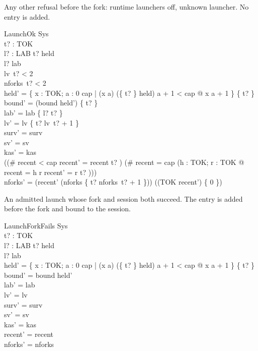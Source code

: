 \documentclass[a4paper,10pt,fleqn]{article}
\begin{document}
Any other refusal before the fork: runtime launchers off, unknown launcher. No entry is added.

\begin{schema}{LaunchOk}
  \Delta Sys \\
  t? : TOK \\ l? : LAB
\where
  t? \notin \dom held \\
  l? \notin \dom lab \\
  lv~t? < 2 \\
  nforks~t? < 2 \\
  held' = \{ x : TOK; a : 0 \upto cap | (x \mapsto a) \in (\{ t? \} \ndres held) \land a + 1 < cap @ x \mapsto a + 1 \} \cup \{ t?  \} \\
  bound' = (bound \cap \dom held') \cup \{ t? \} \\
  lab' = lab \cup \{ l? \mapsto t? \} \\
  lv' = lv \oplus \{ t? \mapsto lv~t? + 1 \} \\
  surv' = surv \\
  sv' = sv \\
  kas' = kas \\
  ((\# recent < cap \land recent' = recent \cat \langle t? \rangle) \lor (\# recent = cap \land (\exists h : TOK; r : \seq TOK @ recent = \langle h \rangle \cat r \land recent' = r \cat \langle t? \rangle))) \\
  nforks' = (\ran recent' \dres (nforks \oplus \{ t? \mapsto nforks~t? + 1 \})) \cup ((TOK \setminus \ran recent') \cross \{ 0 \})
\end{schema}

An admitted launch whose fork and session both succeed. The entry is added before the fork and bound to the session.

\begin{schema}{LaunchForkFails}
  \Delta Sys \\
  t? : TOK \\ l? : LAB
\where
  t? \notin \dom held \\
  l? \notin \dom lab \\
  held' = \{ x : TOK; a : 0 \upto cap | (x \mapsto a) \in (\{ t? \} \ndres held) \land a + 1 < cap @ x \mapsto a + 1 \} \cup \{ t?  \} \\
  bound' = bound \cap \dom held' \\
  lab' = lab \\
  lv' = lv \\
  surv' = surv \\
  sv' = sv \\
  kas' = kas \\
  recent' = recent \\
  nforks' = nforks
\end{schema}
\end{document}

